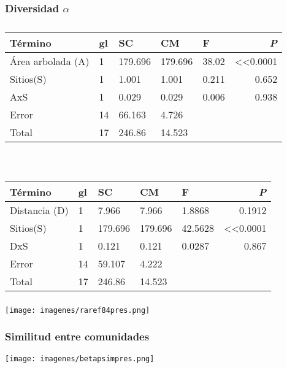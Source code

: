\documentclass[compress]{beamer}
\begin{document}
{
\begin{frame}
\frametitle{Diversidad $\alpha$}
\begin{center}
{\tiny
\begin{longtable}[c] {lllllr} 
\caption[]{} \\
 Término & gl & SC & CM & F & \textit{P} \\ \midrule
Área arbolada (A) &1& 179.696 & 179.696 & 38.02 & <<0.0001 \\
Sitios(S) & 1 & 1.001  & 1.001 & 0.211 & 0.652 \\
AxS &1& 0.029 & 0.029 & 0.006 & 0.938 \\ 
Error &14& 66.163 & 4.726  \\
Total &17& 246.86 & 14.523 \\ \bottomrule 
\end{longtable}
}
\end{center}\\
\begin{center}
{\tiny
\begin{longtable}[c] {lllllr} 
\caption[]{} \\
 Término &gl& SC & CM & F & \textit{P} \\ \midrule
Distancia (D) &1& 7.966 & 7.966 & 1.8868 & 0.1912  \\
Sitios(S)  &1& 179.696 & 179.696 &42.5628& <<0.0001 \\
DxS &1& 0.121 & 0.121 & 0.0287 & 0.867  \\ 
Error & 14 & 59.107 & 4.222 \\
Total &17& 246.86 & 14.523  \\ \bottomrule 
\end{longtable}
} 
\end{center}
\end{frame}
}

{
\begin{frame}
\frametitle{}
\begin{center}
\texttt{[image: imagenes/raref84pres.png]}\\
\end{center}

\end{frame}
}

{
\begin{frame}
\frametitle{Similitud entre comunidades}
\vspace{-0.8cm}
\begin{center}
\texttt{[image: imagenes/betapsimpres.png]}\\
\end{center}

\end{frame}
}
\end{document}
